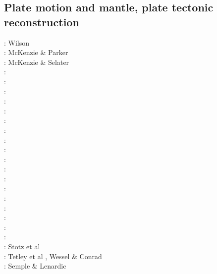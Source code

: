 \subsection{Plate motion and mantle, plate tectonic reconstruction}

{\scriptsize
\nineteensixtysix: Wilson \cite{wils66}\\
\nineteensixtyseven: McKenzie \& Parker \cite{mcpa67}\\
\nineteenseventythree: McKenzie \& Selater \cite{mcse73}\\
\nineteenseventyfour: \cite{sosl74}\\
\nineteenseventyfive: \cite{harp75}\\
\nineteenninety: \cite{dega90}\\
\nineteenninetytwo: \cite{zieg92a}\\
\nineteenninetyfour: \cite{guto94}\\
\nineteenninetyseven: \cite{wean97b}\\
\nineteenninetyeight: \cite{zhgm98}\\
\nineteenninetynine: \cite{ribr99}\\
\twothousandone: \cite{yohk01}\\
\twothousandtwo: \cite{stoc02}\\
\twothousandthree: \cite{evan03}\cite{reta03}\\
\twothousandseven: \cite{zhzl07}\\
\twothousandnine: \cite{lizh09}\cite{vasv09}\cite{iabu09}\cite{scbs09}\\
\twothousandten: \cite{stto10}\cite{dega10}\\
\twothousandtwelve: \cite{huss12}\cite{gutz12}\cite{qumm12}\cite{holr12}\cite{dost12}\cite{shbs12}\\
\twothousandthirteen: \cite{mosq13}\cite{cost13}\\
\twothousandfifteen: \cite{yoha15}\\
\twothousandsixteen: \cite{pric16}\\
\twothousandseventeen: Stotz et al \cite{stid17}\\
\twothousandnineteen: Tetley et al \cite{tewg19}, Wessel \& Conrad \cite{weco19}\\
\twothousandtwenty: Semple \& Lenardic \cite{sele20}
}

